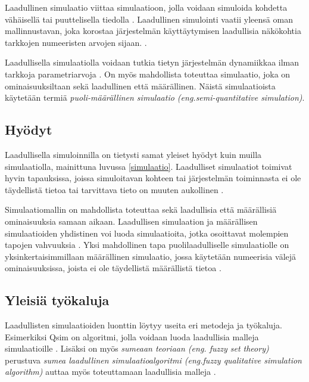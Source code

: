 \documentclass[utf8]{gradu3}
\begin{document}
Laadullinen simulaatio viittaa simulaatioon, jolla voidaan simuloida kohdetta
vähäisellä tai puuttelisella tiedolla \parencite{kuipers1986qualitative}.
Laadullinen simulointi vaatii yleensä oman mallinnustavan, joka korostaa järjestelmän käyttäytymisen laadullisia näkökohtia tarkkojen numeeristen arvojen sijaan. 
%
\parencites%
  {parallelQualitativeSimulation1997}%
  {kuipers1986qualitative}%
\relax.
%

Laadullisella simulaatiolla voidaan tutkia tietyn järjestelmän dynamiikkaa ilman tarkkoja parametriarvoja \parencite{cosme2023history}. On myös mahdollista toteuttaa simulaatio, joka on ominaisuuksiltaan sekä laadullinen että määrällinen. Näistä simulaatioista käytetään termiä \textit{ puoli-määrällinen simulaatio (eng.semi-quantitative simulation)}\parencite{semiHybrid1997qualitative}.

\subsection{Hyödyt}
Laadullisella simuloinnilla on tietysti samat yleiset hyödyt kuin muilla simulaatiolla, mainittuna luvussa \ref{simulaatio}. Laadulliset simulaatiot toimivat hyvin tapauksissa, joissa simuloitavan kohteen tai järjestelmän toiminnasta ei ole täydellistä tietoa tai tarvittava tieto on muuten aukollinen \parencite{kuipers1986qualitative}. 

Simulaatiomallin on mahdollista toteuttaa sekä laadullisia että määrällisiä ominaisuuksia samaan aikaan. Laadullisen simulaation ja määrällisen simulaatioiden yhdistinen voi luoda simulaatioita, jotka osoittavat molempien tapojen vahvuuksia \parencite{semiHybrid1997qualitative}. Yksi mahdollinen tapa puolilaadulliselle simulaatiolle on yksinkertaisimmillaan määrällinen simulaatio, jossa käytetään numeerisia välejä ominaisuuksissa, joista ei ole täydellistä määrällistä tietoa \parencite{semiHybrid1997qualitative}.

\subsection{Yleisiä työkaluja}
Laadullisten simulaatioiden luonttin löytyy useita eri metodeja ja työkaluja.
Esimerkiksi Qsim on algoritmi, jolla voidaan luoda laadullisia malleja simulaatioille
\parencite{kuipers1986qualitative}. 
Lisäksi on myös \textit{sumeaan teoriaan (eng. fuzzy set theory)} 
perustuva \textit{sumea laadullinen simulaatioalgoritmi 
(eng.fuzzy qualitative simulation algorithm)} 
auttaa myös toteuttamaan laadullisia malleja \parencite{shen1993fuzzy}.
\end{document}
